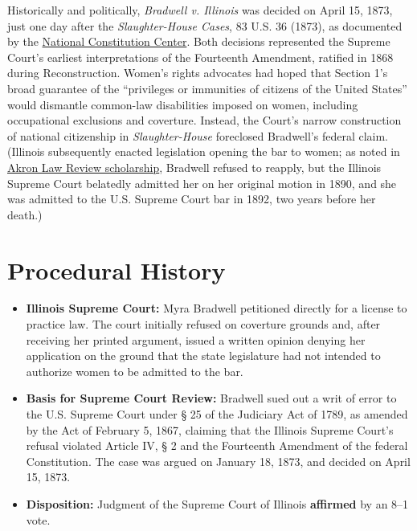 \documentclass[12pt]{article}
\begin{document}
Historically and politically, \textit{Bradwell v. Illinois} was decided on April 15, 1873, just one day after the \textit{Slaughter-House Cases}, 83 U.S. 36 (1873), as documented by the \href{https://constitutioncenter.org/the-constitution/supreme-court-case-library/bradwell-v-illinois-1873}{National Constitution Center}. Both decisions represented the Supreme Court's earliest interpretations of the Fourteenth Amendment, ratified in 1868 during Reconstruction. Women's rights advocates had hoped that Section 1's broad guarantee of the ``privileges or immunities of citizens of the United States'' would dismantle common-law disabilities imposed on women, including occupational exclusions and coverture. Instead, the Court's narrow construction of national citizenship in \textit{Slaughter-House} foreclosed Bradwell's federal claim. (Illinois subsequently enacted legislation opening the bar to women; as noted in \href{https://ideaexchange.uakron.edu/cgi/viewcontent.cgi?article=1164&context=akronlawreview}{Akron Law Review scholarship}, Bradwell refused to reapply, but the Illinois Supreme Court belatedly admitted her on her original motion in 1890, and she was admitted to the U.S. Supreme Court bar in 1892, two years before her death.)

\section{Procedural History}

\begin{itemize}
  \item \textbf{Illinois Supreme Court:} Myra Bradwell petitioned directly for a license to practice law. The court initially refused on coverture grounds and, after receiving her printed argument, issued a written opinion denying her application on the ground that the state legislature had not intended to authorize women to be admitted to the bar.
  \item \textbf{Basis for Supreme Court Review:} Bradwell sued out a writ of error to the U.S. Supreme Court under \S{} 25 of the Judiciary Act of 1789, as amended by the Act of February 5, 1867, claiming that the Illinois Supreme Court's refusal violated Article IV, \S{} 2 and the Fourteenth Amendment of the federal Constitution. The case was argued on January 18, 1873, and decided on April 15, 1873.
  \item \textbf{Disposition:} Judgment of the Supreme Court of Illinois \textbf{affirmed} by an 8--1 vote.
\end{itemize}
\end{document}

